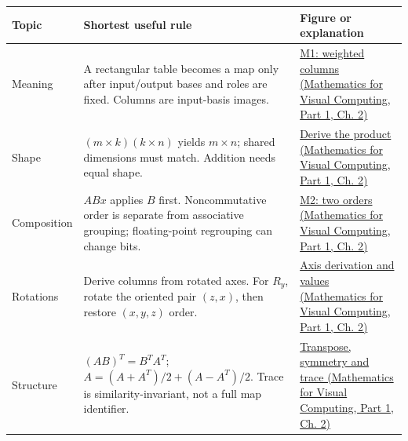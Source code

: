 {\def\LTcaptype{none} %
\begin{longtable}[]{@{}
  >{\raggedright\arraybackslash}p{}
  >{\raggedright\arraybackslash}p{}
  >{\raggedright\arraybackslash}p{}@{}}
\toprule\noalign{}
\begin{minipage}[b]{\linewidth}\raggedright
Topic
\end{minipage} & \begin{minipage}[b]{\linewidth}\raggedright
Shortest useful rule
\end{minipage} & \begin{minipage}[b]{\linewidth}\raggedright
Figure or explanation
\end{minipage} \\
\midrule\noalign{}
\endhead
\bottomrule\noalign{}
\endlastfoot
Meaning & A rectangular table becomes a map only after input/output bases and roles are fixed. Columns are input-basis images. & \href{../02-Mathematics-for-Visual-Computing-P01/main.pdf\#nameddest=01-foundations-i-ch018-figure-m1---coordinates-weight-the-new-basis-directions}{M1: weighted columns (Mathematics for Visual Computing, Part 1, Ch. 2)} \\
Shape & \((m\times k)(k\times n)\) yields \(m\times n\); shared dimensions must match. Addition needs equal shape. & \href{../02-Mathematics-for-Visual-Computing-P01/main.pdf\#nameddest=01-foundations-i-ch018-combining-rules-explains-the-multiplication-law}{Derive the product (Mathematics for Visual Computing, Part 1, Ch. 2)} \\
Composition & \(ABx\) applies \(B\) first. Noncommutative order is separate from associative grouping; floating-point regrouping can change bits. & \href{../02-Mathematics-for-Visual-Computing-P01/main.pdf\#nameddest=01-foundations-i-ch018-figure-m2---the-same-operations-give-different-results-in-different-orders}{M2: two orders (Mathematics for Visual Computing, Part 1, Ch. 2)} \\
Rotations & Derive columns from rotated axes. For \(R_y\), rotate the oriented pair \((z,x)\), then restore \((x,y,z)\) order. & \href{../02-Mathematics-for-Visual-Computing-P01/main.pdf\#nameddest=01-foundations-i-ch018-the-oriented-plane-explains-the-y-rotation-signs}{Axis derivation and values (Mathematics for Visual Computing, Part 1, Ch. 2)} \\
Structure & \((AB)^T=B^TA^T\); \(A=(A+A^T)/2+(A-A^T)/2\). Trace is similarity-invariant, not a full map identifier. & \href{../02-Mathematics-for-Visual-Computing-P01/main.pdf\#nameddest=01-foundations-i-ch018-transpose-lets-us-compare-measurements-and-structure}{Transpose, symmetry and trace (Mathematics for Visual Computing, Part 1, Ch. 2)} \\

\end{longtable}}
